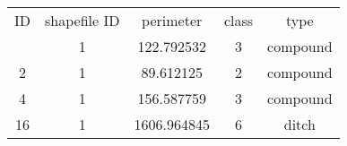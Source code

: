 \begin{tabular}{ccccc}
    \toprule
    ID & shapefile ID & perimeter & class & type\\
    \otoprule
    1 & 1 & 122.792532 & 3 & compound\\
    2 & 1 & 89.612125 & 2 & compound\\
    4 & 1 & 156.587759 & 3 & compound\\
    16 & 1 & 1606.964845 & 6 & ditch\\
    \bottomrule
\end{tabular}
